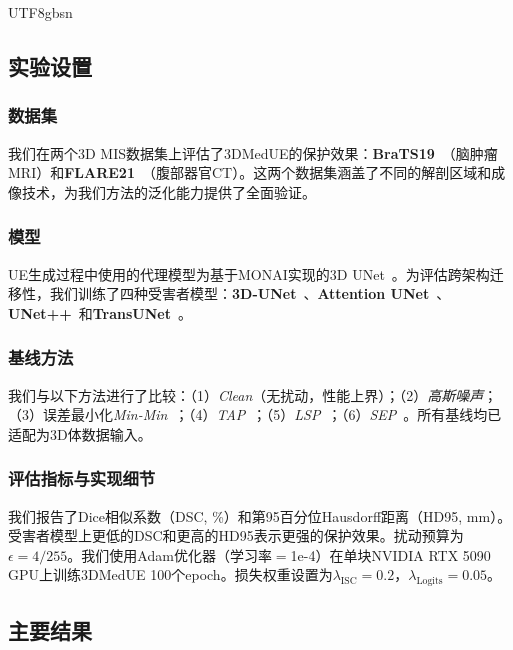 \documentclass[a4paper,11pt]{article}
\begin{document}
\begin{CJK}{UTF8}{gbsn}
\subsection{实验设置}

\subsubsection{数据集}
我们在两个3D MIS数据集上评估了3DMedUE的保护效果：\textbf{BraTS19}~\cite{menze2014multimodal}（脑肿瘤MRI）和\textbf{FLARE21}~\cite{ma2021abdomenct}（腹部器官CT）。这两个数据集涵盖了不同的解剖区域和成像技术，为我们方法的泛化能力提供了全面验证。

\subsubsection{模型}
UE生成过程中使用的代理模型为基于MONAI实现的3D UNet~\cite{cciccek20163d}。为评估跨架构迁移性，我们训练了四种受害者模型：\textbf{3D-UNet}~\cite{cciccek20163d}、\textbf{Attention UNet}~\cite{oktay2018attention}、\textbf{UNet++}~\cite{zhou2018unetpp}和\textbf{TransUNet}~\cite{chen2021transunet}。

\subsubsection{基线方法}
我们与以下方法进行了比较：（1）\textit{Clean}（无扰动，性能上界）；（2）\textit{高斯噪声}；（3）误差最小化\textit{Min-Min}~\cite{huang2021unlearnable}；（4）\textit{TAP}~\cite{fowl2021adversarial}；（5）\textit{LSP}~\cite{yu2022availability}；（6）\textit{SEP}~\cite{liu2023stable}。所有基线均已适配为3D体数据输入。

\subsubsection{评估指标与实现细节}
我们报告了Dice相似系数（DSC, \%）和第95百分位Hausdorff距离（HD95, mm）。受害者模型上更低的DSC和更高的HD95表示更强的保护效果。扰动预算为$\epsilon=4/255$。我们使用Adam优化器（学习率$=$1e-4）在单块NVIDIA RTX 5090 GPU上训练3DMedUE 100个epoch。损失权重设置为$\lambda_{\text{ISC}}=0.2$，$\lambda_{\text{Logits}}=0.05$。

\subsection{主要结果}


\end{CJK}
\end{document}
